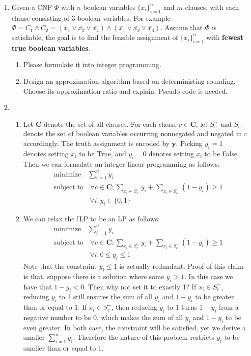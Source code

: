 \documentclass[12pt,a4paper]{article}
\makeatletter
\newtheorem*{solution}{Solution}
\theoremstyle{definition}
\renewenvironment{solution}[1][Solution] {\par\pushQED{\qed}\normalfont\topsep6\p@\@plus6\p@\relax\trivlist\item[\hskip\labelsep\bfseries#1\@addpunct{.}]\ignorespaces}{\popQED\endtrivlist\@endpefalse} \makeatother
\makeatother
\begin{document}
\begin{enumerate}
    

\item Given a CNF $\Phi$ with $n$ boolean variables $\{x_i\}_{i=1}^n$ and $m$ clauses, with each clause consisting of $3$ boolean variables. For example $\Phi=C_1\wedge C_2 =(x_1\vee \overline{x_2}\vee \overline{x_4})\wedge (\overline{x_1} \vee \overline{x_2} \vee \overline{x_3})$. Assume that $\Phi$ is satisfiable, the goal is to find the feasible assignment of $\{x_i\}_{i=1}^n$ with \textbf{fewest true boolean variables}.
\begin{enumerate}
\item  Please formulate it into integer programming.\par
\item  Design an approximation algorithm based on deterministing rounding. Choose its approximation ratio and explain. Pseudo code is needed.\par
\end{enumerate}
\begin{solution}
  \begin{enumerate}
    \item Let $\mathbf{C}$ denote the set of all clauses. For each clause $c\in\mathbf{C}$, let $S_c^+$ and $S_c^-$ denote the set of boolean variables occurring nonnegated and negated in $c$ accordingly. The truth assignment is encoded by $\mathbf{y}$. Picking $y_i=1$ denotes setting $x_i$ to be True, and $y_i=0$ denotes setting $x_i$ to be False. Then we can formulate an integer linear programming as follows:
    \begin{align*}
      &\text{minimize} \quad \sum_{i=1}^ny_i\\
      &\text{subject to} \quad \forall c\in \mathbf{C}:\sum_{x_i\in S_c^+}y_i+\sum_{x_i\in S_c^-}(1-y_i)\geq 1\\
      &\qquad\qquad\quad\;\forall i:y_i\in\{0,1\}
    \end{align*}
    \item We can relax the ILP to be an LP as follows:
    \begin{align*}
      &\text{minimize} \quad \sum_{i=1}^ny_i\\
      &\text{subject to} \quad \forall c\in \mathbf{C}:\sum_{x_i\in S_c^+}y_i+\sum_{x_i\in S_c^-}(1-y_i)\geq 1\\
      &\qquad\qquad\quad\;\forall i:0\leq y_i\leq 1
    \end{align*}
    Note that the constraint $y_i\leq1$ is actually redundant. Proof of this claim is that, suppose there is a solution where some $y_i>1$. In this case we have that $1-y_i<0$. Then why not set it to exactly 1? If $x_i\in S_c^+$, reducing $y_i$ to 1 still ensures the sum of all $y_i$ and $1-y_i$ to be greater than or equal to 1. If  $x_i\in S_c^-$, then reducing $y_i$ to 1 turns $1-y_i$ from a negative number to be 0, which  makes the sum of all $y_i$ and $1-y_i$ to be even greater. In both case, the constraint will be satisfied, yet we derive a smaller $\sum_{i=1}^ny_i$. Therefore the nature of this problem restricts $y_i$ to be smaller than or equal to 1.


\end{enumerate}
\end{solution}
\end{enumerate}
\end{document}
